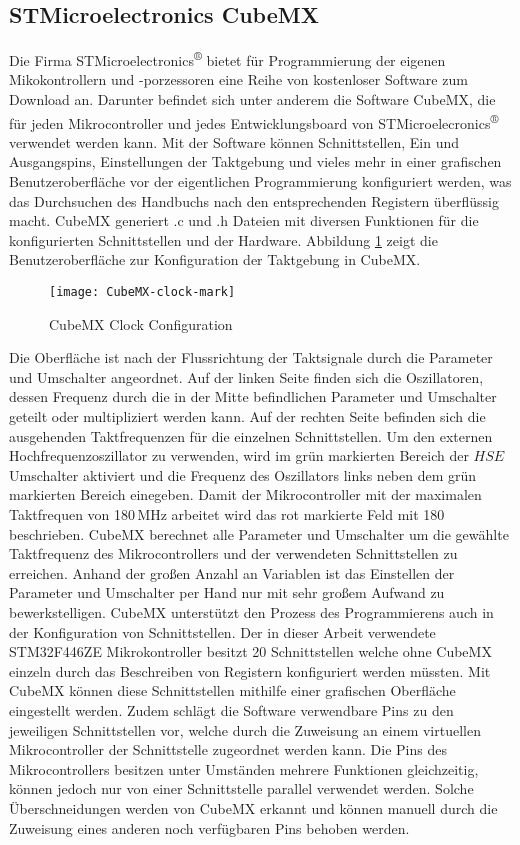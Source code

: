 
\subsection{STMicroelectronics CubeMX}
Die Firma STMicroelectronics\textsuperscript{®} bietet für Programmierung der eigenen Mikokontrollern und -porzessoren eine Reihe von kostenloser Software zum Download an. Darunter befindet sich unter anderem die Software CubeMX, die für jeden Mikrocontroller und jedes Entwicklungsboard von STMicroelecronics\textsuperscript{®} verwendet werden kann. Mit der Software können Schnittstellen, Ein und Ausgangspins, Einstellungen der Taktgebung und vieles mehr in einer grafischen Benutzeroberfläche vor der eigentlichen Programmierung konfiguriert werden, was das Durchsuchen des Handbuchs nach den entsprechenden Registern überflüssig macht. CubeMX generiert .c und .h Dateien mit diversen Funktionen für die konfigurierten Schnittstellen und der Hardware. 
Abbildung \ref{fig:CubeMXClock} zeigt die Benutzeroberfläche zur Konfiguration der Taktgebung in CubeMX. 
\begin{figure}[h]
	\centering
	\texttt{[image: CubeMX-clock-mark]}
	\caption{CubeMX Clock Configuration}
	\label{fig:CubeMXClock}
\end{figure}
Die Oberfläche ist nach der Flussrichtung der Taktsignale durch die Parameter und Umschalter angeordnet. Auf der linken Seite finden sich die Oszillatoren, dessen Frequenz durch die in der Mitte befindlichen Parameter und Umschalter geteilt oder multipliziert werden kann. Auf der rechten Seite befinden sich die ausgehenden Taktfrequenzen für die einzelnen Schnittstellen. Um den externen Hochfrequenzoszillator zu verwenden, wird im grün markierten Bereich der $HSE$ Umschalter aktiviert und die Frequenz des Oszillators links neben dem grün markierten Bereich einegeben. Damit der Mikrocontroller mit der maximalen Taktfrequen von 180\,MHz arbeitet wird das rot markierte Feld mit 180 beschrieben. CubeMX berechnet alle Parameter und Umschalter um die gewählte Taktfrequenz des Mikrocontrollers und der verwendeten Schnittstellen zu erreichen. Anhand der großen Anzahl an Variablen ist das Einstellen der Parameter und Umschalter per Hand nur mit sehr großem Aufwand zu bewerkstelligen. CubeMX unterstützt den Prozess des Programmierens auch in der Konfiguration von Schnittstellen. Der in dieser Arbeit verwendete STM32F446ZE Mikrokontroller besitzt 20 Schnittstellen welche ohne CubeMX einzeln durch das Beschreiben von Registern konfiguriert werden müssten. Mit CubeMX können diese Schnittstellen mithilfe einer grafischen Oberfläche eingestellt werden. Zudem schlägt die Software verwendbare Pins zu den jeweiligen Schnittstellen vor, welche durch die Zuweisung an einem virtuellen Mikrocontroller der Schnittstelle zugeordnet werden kann. Die Pins des Mikrocontrollers besitzen unter Umständen mehrere Funktionen gleichzeitig, können jedoch nur von einer Schnittstelle parallel verwendet werden.  Solche Überschneidungen werden von CubeMX erkannt und können manuell durch die Zuweisung eines anderen noch verfügbaren Pins behoben werden.
